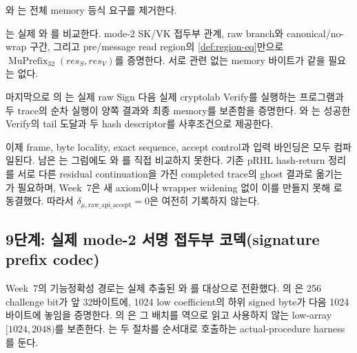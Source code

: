 와
는 전체 memory 등식 요구를 제거한다.

\begin{verified}[실제 생성 해시의 구간 국소 동치]
\label{thm:region-local-mu}
는 실제
와 를 비교한다. mode-2
SK/VK 접두부 관계, raw branch와 canonical/no-wrap 구간, 그리고 pre/message
read region의 \cref{def:region-eq}만으로
\(\operatorname{MuPrefix}_{32}(res_S,res_V)\)를 증명한다. 서로 관련 없는
memory 바이트가 같을 필요는 없다.
\end{verified}

마지막으로 의
는 실제 raw Sign 다음 실제
cryptolab Verify를 실행하는 프로그램과 두 trace의 순차 실행이 양쪽 결과와
최종 memory를 보존함을 증명한다.
와
는 성공한 Verify의
tail 도달과 두 hash descriptor를 사후조건으로 제공한다.

이제 frame, byte locality, exact sequence, accept control과 입력 바인딩은 모두
컴파일된다. 남은 는 그럼에도
와
를 직접 비교하지 못한다. 기존
pRHL hash-return 정리를 서로 다른 residual continuation을 가진 completed
trace의 ghost 결과로 옮기는 가 필요하며, Week~7은
새 axiom이나 wrapper widening 없이 이를 만들지 못해 \statusdeferred 로
동결했다. 따라서 \(\delta_{\mu,\mathrm{raw\_api\_accept}}=0\)은 여전히
기록하지 않는다.

\subsection{9단계: 실제 mode-2 서명 접두부 코덱(signature prefix codec)}

Week~7의 기능정확성 경로는 실제 추출된
와 를 대상으로
전환했다. 의
은 256 challenge bit가 앞 32바이트에,
1024 low coefficient의 하위 signed byte가 다음 1024바이트에 놓임을 증명한다.
의
은 그 배치를 역으로 읽고 사용하지
않는 low-array \([1024,2048)\)를 보존한다.
는 두 절차를 순서대로 호출하는
actual-procedure harness를 둔다.

